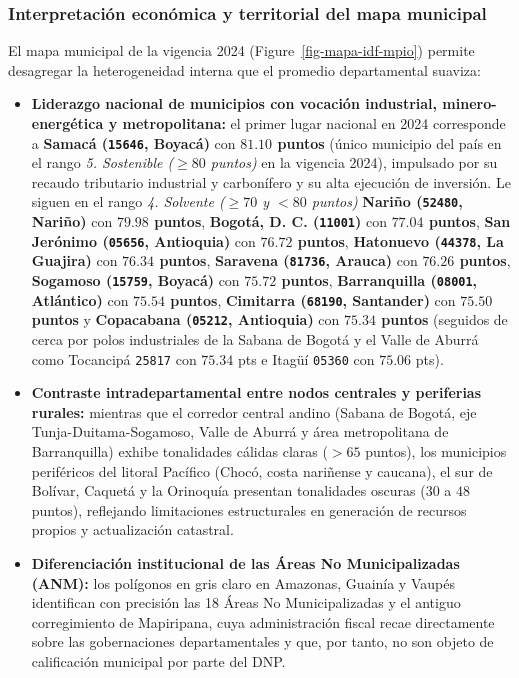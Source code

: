 \documentclass[
  10pt,
  letterpaper,
  DIV=11,
  numbers=noendperiod]{scrartcl}
\providecommand{\tightlist}{%
  \setlength{\itemsep}{0pt}\setlength{\parskip}{0pt}}
\begin{document}
\subsubsection{Interpretación económica y territorial del mapa
municipal}\label{interpretaciuxf3n-econuxf3mica-y-territorial-del-mapa-municipal}

El mapa municipal de la vigencia 2024 (Figure~\ref{fig-mapa-idf-mpio})
permite desagregar la heterogeneidad interna que el promedio
departamental suaviza:

\begin{itemize}
\tightlist
\item
  \textbf{Liderazgo nacional de municipios con vocación industrial,
  minero-energética y metropolitana:} el primer lugar nacional en 2024
  corresponde a \textbf{Samacá (\texttt{15646}, Boyacá)} con
  \textbf{\(81.10\) puntos} (único municipio del país en el rango
  \emph{5. Sostenible (\(\ge 80\) puntos)} en la vigencia 2024),
  impulsado por su recaudo tributario industrial y carbonífero y su alta
  ejecución de inversión. Le siguen en el rango \emph{4. Solvente
  (\(\ge 70\) y \(< 80\) puntos)} \textbf{Nariño (\texttt{52480},
  Nariño)} con \textbf{\(79.98\) puntos}, \textbf{Bogotá, D. C.
  (\texttt{11001})} con \textbf{\(77.04\) puntos}, \textbf{San Jerónimo
  (\texttt{05656}, Antioquia)} con \textbf{\(76.72\) puntos},
  \textbf{Hatonuevo (\texttt{44378}, La Guajira)} con \textbf{\(76.34\)
  puntos}, \textbf{Saravena (\texttt{81736}, Arauca)} con
  \textbf{\(76.26\) puntos}, \textbf{Sogamoso (\texttt{15759}, Boyacá)}
  con \textbf{\(75.72\) puntos}, \textbf{Barranquilla (\texttt{08001},
  Atlántico)} con \textbf{\(75.54\) puntos}, \textbf{Cimitarra
  (\texttt{68190}, Santander)} con \textbf{\(75.50\) puntos} y
  \textbf{Copacabana (\texttt{05212}, Antioquia)} con \textbf{\(75.34\)
  puntos} (seguidos de cerca por polos industriales de la Sabana de
  Bogotá y el Valle de Aburrá como Tocancipá \texttt{25817} con
  \(75.34\) pts e Itagüí \texttt{05360} con \(75.06\) pts).
\item
  \textbf{Contraste intradepartamental entre nodos centrales y
  periferias rurales:} mientras que el corredor central andino (Sabana
  de Bogotá, eje Tunja-Duitama-Sogamoso, Valle de Aburrá y área
  metropolitana de Barranquilla) exhibe tonalidades cálidas claras
  (\(>65\) puntos), los municipios periféricos del litoral Pacífico
  (Chocó, costa nariñense y caucana), el sur de Bolívar, Caquetá y la
  Orinoquía presentan tonalidades oscuras (\(30\) a \(48\) puntos),
  reflejando limitaciones estructurales en generación de recursos
  propios y actualización catastral.
\item
  \textbf{Diferenciación institucional de las Áreas No Municipalizadas
  (ANM):} los polígonos en gris claro en Amazonas, Guainía y Vaupés
  identifican con precisión las 18 Áreas No Municipalizadas y el antiguo
  corregimiento de Mapiripana, cuya administración fiscal recae
  directamente sobre las gobernaciones departamentales y que, por tanto,
  no son objeto de calificación municipal por parte del DNP.
\end{itemize}
\end{document}
